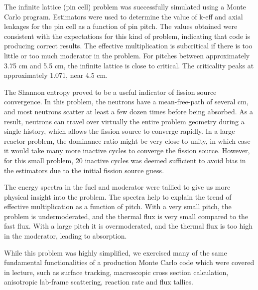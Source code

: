 
The infinite lattice (pin cell) problem was successfully simulated using a Monte Carlo program. Estimators were used to determine the value of k-eff and axial leakages for the pin cell as a function of pin pitch.  The values obtained were consistent with the expectations for this kind of problem, indicating that code is producing correct results. The effective multiplication is subcritical if there is too little or too much moderator in the problem. For pitches between approximately 3.75 cm and 5.5 cm, the infinite lattice is close to critical. The criticality peaks at approximately 1.071, near 4.5 cm.

The Shannon entropy proved to be a useful indicator of fission source convergence. In this problem, the neutrons have a mean-free-path of several cm, and most neutrons scatter at least a few dozen times before being absorbed. As a result, neutrons can travel over virtually the entire problem geometry during a single history, which allows the fission source to converge rapidly. In a large reactor problem, the dominance ratio might be very close to unity, in which case it would take many more inactive cycles to converge the fission source. However, for this small problem, 20 inactive cycles was deemed sufficient to avoid bias in the estimators due to the initial fission source guess.

The energy spectra in the fuel and moderator were tallied to give us more physical insight into the problem. The spectra help to explain the trend of effective multiplication as a function of pitch. With a very small pitch, the problem is undermoderated, and the thermal flux is very small compared to the fast flux. With a large pitch it is overmoderated, and the thermal flux is too high in the moderator, leading to absorption.

While this problem was highly simplified, we exercised many of the same fundamental functionalities of a production Monte Carlo code which were covered in lecture, such as surface tracking, macroscopic cross section calculation, anisotropic lab-frame scattering, reaction rate and flux tallies.